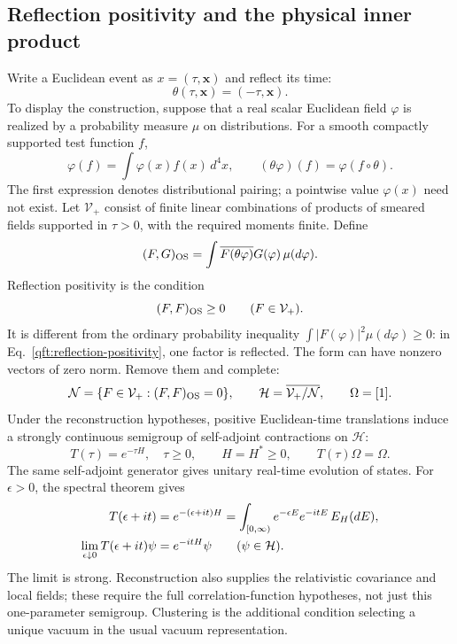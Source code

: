 \subsection{Reflection positivity and the physical inner product}
Write a Euclidean event as $x=(\tau,\mathbf x)$ and reflect its time:
\begin{equation}\label{qft:euclidean-reflection}
 \theta(\tau,\mathbf x)=(-\tau,\mathbf x).
\end{equation}
To display the construction, suppose that a real scalar Euclidean field
$\varphi$ is realized by a probability measure $\mu$ on distributions.
For a smooth compactly supported test function $f$,
\begin{equation}\label{qft:euclidean-smearing}
 \varphi(f)=\int\varphi(x)f(x)\,d^4x,\qquad
 (\theta\varphi)(f)=\varphi(f\circ\theta).
\end{equation}
The first expression denotes distributional pairing; a pointwise value
$\varphi(x)$ need not exist. Let $\mathcal V_+$ consist of finite linear
combinations of products of smeared fields supported in $\tau>0$, with
the required moments finite. Define
\begin{equation}\label{qft:os-inner-product}
 (F,G)_{\rm OS}
 =\int\overline{F(\theta\varphi)}G(\varphi)\,\mu(d\varphi).
\end{equation}
Reflection positivity is the condition
\begin{equation}\label{qft:reflection-positivity}
 (F,F)_{\rm OS}\ge0\qquad(F\in\mathcal V_+).
\end{equation}
It is different from the ordinary probability inequality
$\int|F(\varphi)|^2\mu(d\varphi)\ge0$: in
Eq.~\eqref{qft:reflection-positivity}, one factor is reflected.
The form can have nonzero vectors of zero norm. Remove them and complete:
\begin{equation}\label{qft:os-hilbert-space}
 \mathcal N=\{F\in\mathcal V_+:(F,F)_{\rm OS}=0\},\qquad
 \mathcal H=\overline{\mathcal V_+/\mathcal N},\qquad
 \Omega=[1].
\end{equation}
Under the reconstruction hypotheses, positive Euclidean-time translations
induce a strongly continuous semigroup of self-adjoint contractions on
$\mathcal H$:
\begin{equation}\label{qft:os-semigroup}
 T(\tau)=e^{-\tau H},\quad \tau\ge0,\qquad H=H^*\ge0,
 \qquad T(\tau)\Omega=\Omega.
\end{equation}
The same self-adjoint generator gives unitary real-time evolution of
states. For $\epsilon>0$, the spectral theorem gives
\begin{align}
 T(\epsilon+it)
 &=e^{-(\epsilon+it)H}
   =\int_{[0,\infty)}e^{-\epsilon E}e^{-itE}\,E_H(dE),\notag\\
 \lim_{\epsilon\downarrow0}T(\epsilon+it)\psi
 &=e^{-itH}\psi\qquad(\psi\in\mathcal H).
 \label{qft:os-real-time}
\end{align}
The limit is strong. Reconstruction also supplies the relativistic
covariance and local fields; these require the full correlation-function
hypotheses, not just this one-parameter semigroup. Clustering is the
additional condition selecting a unique vacuum in the usual vacuum
representation.

